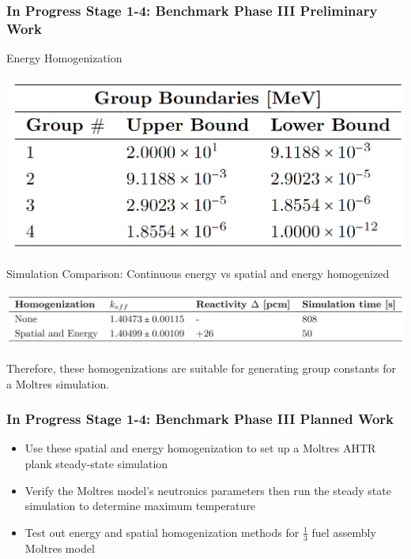 \begin{frame}
    \frametitle{In Progress Stage 1-4: Benchmark Phase III Preliminary Work}
    \begin{block}{Energy Homogenization}
        \begin{table}[]
            \centering
            \begin{minipage}[c]{0.6\textwidth}
                \centering
                \includegraphics[width=0.7\linewidth]{figures/ahtr-energy-discr.png}
            \end{minipage}\hfill
            \begin{minipage}[c]{0.4\textwidth}
            \caption{4-group energy structures for AHTR geometry 
            derived by \cite{gentry_development_2016}.}
        \end{minipage}
        \end{table}
    \end{block}
    \vspace{-0.3cm}
    \begin{block}{Simulation Comparison: Continuous energy vs spatial 
        and energy homogenized}
        \begin{table}[]
                \centering
                \caption{
                    AHTR fuel slab's $k_{eff}$ for case with continuous energy and 
                    space and case with spatial and energy homogenization.}
                \includegraphics[width=0.9\linewidth]{figures/ahtr-homogenization.png}
        \end{table}
    \vspace{-0.3cm}
    Therefore, these homogenizations are suitable for generating group constants 
    for a Moltres simulation. 
    \end{block}
\end{frame}

\begin{frame}
    \frametitle{In Progress Stage 1-4: Benchmark Phase III Planned Work}
    \begin{itemize}
        \item Use these spatial and energy homogenization to set up a 
        Moltres AHTR plank steady-state simulation 
        \item Verify the Moltres model's neutronics parameters then run 
        the steady state simulation to determine maximum temperature 
        \item Test out energy and spatial homogenization methods for $\frac{1}{3}$
        fuel assembly Moltres model 
    \end{itemize}
\end{frame}
